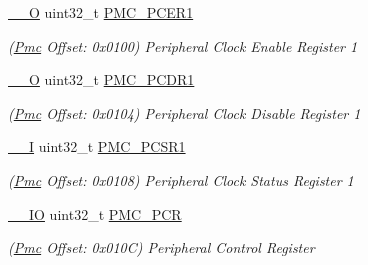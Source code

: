\begin{DoxyCompactItemize}
\item 
\mbox{\label{structPmc_a81f4b68bfbd5af99767d0f2399fe3f7b}} 
\mbox{\hyperlink{core__cm7_8h_a7e25d9380f9ef903923964322e71f2f6}{\+\_\+\+\_\+O}} uint32\+\_\+t \mbox{\hyperlink{structPmc_a81f4b68bfbd5af99767d0f2399fe3f7b}{P\+M\+C\+\_\+\+P\+C\+E\+R1}}
\begin{DoxyCompactList}\small\item\em (\mbox{\hyperlink{structPmc}{Pmc}} Offset\+: 0x0100) Peripheral Clock Enable Register 1 \end{DoxyCompactList}\item 
\mbox{\label{structPmc_ad58099a6b358721d8ab089b86507f594}} 
\mbox{\hyperlink{core__cm7_8h_a7e25d9380f9ef903923964322e71f2f6}{\+\_\+\+\_\+O}} uint32\+\_\+t \mbox{\hyperlink{structPmc_ad58099a6b358721d8ab089b86507f594}{P\+M\+C\+\_\+\+P\+C\+D\+R1}}
\begin{DoxyCompactList}\small\item\em (\mbox{\hyperlink{structPmc}{Pmc}} Offset\+: 0x0104) Peripheral Clock Disable Register 1 \end{DoxyCompactList}\item 
\mbox{\label{structPmc_a7bf86a46ac0364da7ebd068665839336}} 
\mbox{\hyperlink{core__cm7_8h_af63697ed9952cc71e1225efe205f6cd3}{\+\_\+\+\_\+I}} uint32\+\_\+t \mbox{\hyperlink{structPmc_a7bf86a46ac0364da7ebd068665839336}{P\+M\+C\+\_\+\+P\+C\+S\+R1}}
\begin{DoxyCompactList}\small\item\em (\mbox{\hyperlink{structPmc}{Pmc}} Offset\+: 0x0108) Peripheral Clock Status Register 1 \end{DoxyCompactList}\item 
\mbox{\label{structPmc_af45c6852e124da2ccb7da6d195d27ea2}} 
\mbox{\hyperlink{core__cm7_8h_aec43007d9998a0a0e01faede4133d6be}{\+\_\+\+\_\+\+IO}} uint32\+\_\+t \mbox{\hyperlink{structPmc_af45c6852e124da2ccb7da6d195d27ea2}{P\+M\+C\+\_\+\+P\+CR}}
\begin{DoxyCompactList}\small\item\em (\mbox{\hyperlink{structPmc}{Pmc}} Offset\+: 0x010C) Peripheral Control Register \end{DoxyCompactList}\item 
\mbox{\label{structPmc_ac4c245f5ef70e2c0cf019b0301df08eb}} 

\end{DoxyCompactItemize}
